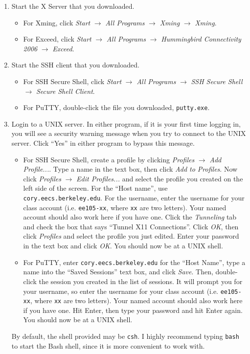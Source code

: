 \documentclass{article}
\begin{document}
\begin{enumerate}
  \item Start the X Server that you downloaded.
    \begin{itemize}
      \item For Xming, click \textit{Start} $\rightarrow$ \textit{All Programs} $\rightarrow$ \textit{Xming} $\rightarrow$ \textit{Xming}.
      \item For Exceed, click \textit{Start} $\rightarrow$ \textit{All Programs} $\rightarrow$ \textit{Hummingbird Connectivity 2006} $\rightarrow$ \textit{Exceed}.
    \end{itemize}
  \item Start the SSH client that you downloaded.
    \begin{itemize}
      \item For SSH Secure Shell, click \textit{Start} $\rightarrow$ \textit{All Programs} $\rightarrow$ \textit{SSH Secure Shell} $\rightarrow$ \textit{Secure Shell Client}.
      \item For PuTTY, double-click the file you downloaded, \verb|putty.exe|.
    \end{itemize}
  \item Login to a UNIX server. In either program, if it is your first time logging in, you will see a security warning message when you try to connect to the UNIX server. Click ``Yes'' in either program to bypass this message.
    \begin{itemize}
      \item For SSH Secure Shell, create a profile by clicking \textit{Profiles} $\rightarrow$ \textit{Add Profile...}. Type a name in the text box, then click \textit{Add to Profiles}. Now click \textit{Profiles} $\rightarrow$ \textit{Edit Profiles...} and select the profile you created on the left side of the screen. For the ``Host name'', use \verb|cory.eecs.berkeley.edu|. For the username, enter the username for your class account (i.e. \verb|ee105-xx|, where \verb|xx| are two letters). Your named account should also work here if you have one. Click the \textit{Tunneling} tab and check the box that says ``Tunnel X11 Connections''. Click \textit{OK}, then click \textit{Profiles} and select the profile you just edited. Enter your password in the text box and click \textit{OK}. You should now be at a UNIX shell.
      \item For PuTTY, enter \verb|cory.eecs.berkeley.edu| for the ``Host Name'', type a name into the ``Saved Sessions'' text box, and click \textit{Save}. Then, double-click the session you created in the list of sessions. It will prompt you for your username, so enter the username for your class account (i.e. \verb|ee105-xx|, where \verb|xx| are two letters). Your named account should also work here if you have one. Hit Enter, then type your password and hit Enter again. You should now be at a UNIX shell.
    \end{itemize}
    By default, the shell provided may be \verb|csh|. I highly recommend typing \verb|bash| to start the Bash shell, since it is more convenient to work with.
\end{enumerate}
\end{document}
